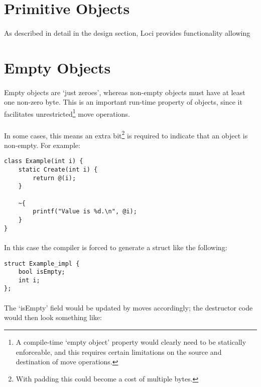 \documentclass[12pt,twoside,notitlepage]{report}
\begin{document}
\section{Primitive Objects}

\paragraph{}
As described in detail in the design section, Loci provides functionality allowing 

\section{Empty Objects}

\paragraph{}
Empty objects are `just zeroes', whereas non-empty objects must have at least one non-zero byte. This is an important run-time property of objects, since it facilitates unrestricted\footnote{A compile-time `empty object' property would clearly need to be statically enforceable, and this requires certain limitations on the source and destination of move operations.} move operations.

\paragraph{}
In some cases, this means an extra bit\footnote{With padding this could become a cost of multiple bytes.} is required to indicate that an object is non-empty. For example:

\begin{lstlisting}
class Example(int i) {
	static Create(int i) {
		return @(i);
	}
	
	~{
		printf("Value is %d.\n", @i);
	}
}
\end{lstlisting}

\paragraph{}
In this case the compiler is forced to generate a struct like the following:

\begin{lstlisting}
struct Example_impl {
	bool isEmpty;
	int i;
};
\end{lstlisting}

\paragraph{}
The `isEmpty' field would be updated by moves accordingly; the destructor code would then look something like:
\end{document}
